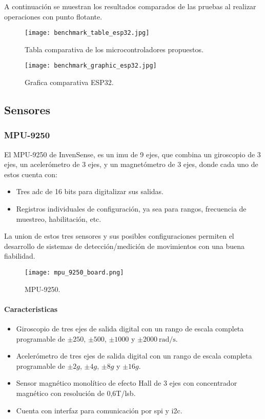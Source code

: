 A continuación se muestran los resultados comparados de las pruebas al realizar operaciones con punto flotante.
\begin{figure}[htp!]
    \centering
    \texttt{[image: benchmark\_table\_esp32.jpg]}
    \caption{Tabla comparativa de los microcontroladores propuestos.}
    \label{fig: table_benchmark}
\end{figure}
\FloatBarrier

\begin{figure}[htp!]
    \centering
    \texttt{[image: benchmark\_graphic\_esp32.jpg]}
    \caption{Grafica comparativa ESP32.}
    \label{fig: graphic_benchmark}
\end{figure}
\FloatBarrier

\subsection{Sensores}
\subsubsection{MPU-9250}
El MPU-9250 de InvenSense, es un \acrshort{imu} de 9 ejes, que combina
un giroscopio de 3 ejes, un acelerómetro de 3 ejes, y un magnetómetro de 3 ejes, donde cada
uno de estos cuenta con:
\begin{itemize}
    \item Tres \acrshort{adc} de 16 bits para digitalizar sus salidas.
    \item Registros individuales de configuración, ya sea para rangos, frecuencia de muestreo, habilitación, etc.
\end{itemize}

La union de estos tres sensores y sus posibles configuraciones permiten el desarrollo de sistemas de detección/medición de
movimientos con una buena fiabilidad.

\begin{figure}[htp]
    \centering
    \texttt{[image: mpu\_9250\_board.png]}
    \caption{MPU-9250. }
\end{figure}

\paragraph{Caracteristicas}
\begin{itemize}
    \item Giroscopio de tres ejes de salida digital con un rango de escala completa programable de $\pm250$, $\pm500$, $\pm1000$ y $\pm\SI{2000}{\radian\per\second}$.
    \item Acelerómetro de tres ejes de salida digital con un rango de escala completa programable de $\pm2g$, $\pm4g$, $\pm8g$ y $\pm16g$.
    \item Sensor magnético monolítico de efecto Hall de 3 ejes con concentrador magnético con resolución de 0,6T/\acrshort{lsb}.
    \item Cuenta con interfaz para comunicación por \acrshort{spi} y \acrshort{i2c}.
\end{itemize}

